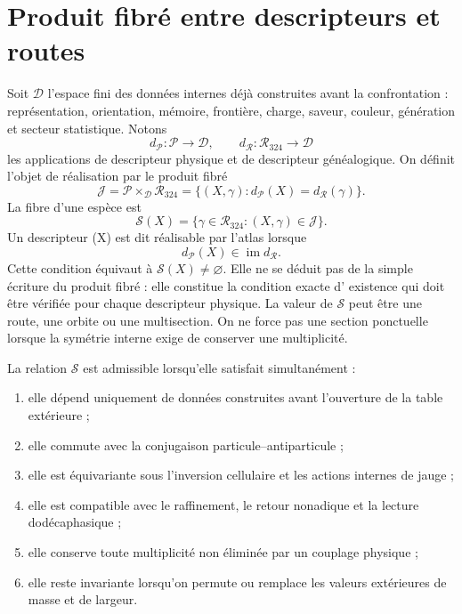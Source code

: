 \section{Produit fibré entre descripteurs et routes}

Soit \(\mathcal D\) l'espace fini des données internes déjà construites avant la
confrontation : représentation, orientation, mémoire, frontière, charge, saveur,
couleur, génération et secteur statistique. Notons
\[
 d_{\mathcal P}:\mathcal P\longrightarrow\mathcal D,
 \qquad
 d_{\mathcal R}:\mathcal R_{324}\longrightarrow\mathcal D
\]
les applications de descripteur physique et de descripteur généalogique. On définit l'objet
de réalisation par le produit fibré
\[
 \mathcal J
 =\mathcal P\times_{\mathcal D}\mathcal R_{324}
 =\{(X,\gamma):d_{\mathcal P}(X)=d_{\mathcal R}(\gamma)\}.
\]
La fibre d'une espèce est
\[
\mathscr S(X)=\{\gamma\in\mathcal R_{324}:(X,\gamma)\in\mathcal J\}.
\]
Un descripteur (X) est dit réalisable par l'atlas lorsque
\[
 d_{\mathcal P}(X)\in\operatorname{im}d_{\mathcal R}.
\]
Cette condition équivaut à \(\mathscr S(X)\ne\varnothing\). Elle ne se déduit pas
de la simple écriture du produit fibré : elle constitue la condition exacte d'
existence qui doit être vérifiée pour chaque descripteur physique.
La valeur de \(\mathscr S\) peut être une route, une orbite ou une multisection.
On ne force pas une section ponctuelle lorsque la symétrie interne exige de conserver
une multiplicité.

\begin{definition}
La relation \(\mathscr S\) est admissible lorsqu'elle satisfait simultanément :
\begin{enumerate}
\item elle dépend uniquement de données construites avant l'ouverture de la table extérieure ;
\item elle commute avec la conjugaison particule--antiparticule ;
\item elle est équivariante sous l'inversion cellulaire et les actions internes de
      jauge ;
\item elle est compatible avec le raffinement, le retour nonadique et la lecture
      dodécaphasique ;
\item elle conserve toute multiplicité non éliminée par un couplage physique ;
\item elle reste invariante lorsqu'on permute ou remplace les valeurs extérieures de
      masse et de largeur.
\end{enumerate}
\end{definition}

